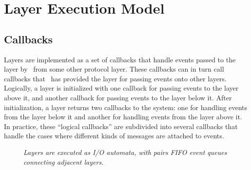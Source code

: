 \section{Layer Execution Model}

\subsection{Callbacks}
Layers are implemented as a set of callbacks that handle events passed to
the layer by \ensemble\ from some other protocol layer.  These callbacks can in
turn call callbacks that \ensemble\ has provided the layer for passing events
onto other layers.  Logically, a layer is initialized with one callback for
passing events to the layer above it, and another callback for passing
events to the layer below it.  After initialization, a layer returns two
callbacks to the system: one for handling events from the layer below it
and another for handling events from the layer above it.  In practice,
these ``logical callbacks'' are subdivided into several callbacks that
handle the cases where different kinds of messages are attached to events.

\begin{figure}[tb]
\begin{center}
\end{center}
\caption{\em Layers are executed as I/O automata, with pairs FIFO event
queues connecting adjacent layers.}
\label{fig:automata}
\end{figure}

